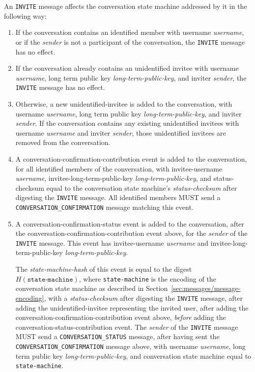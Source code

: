 \documentclass{article}
\def\npmessage#1{\texttt{#1}}
\def\field#1{\textit{#1}}
\def\smfield#1{\textsl{#1}}
\def\type#1{\textsf{#1}}
\begin{document}
An \npmessage{INVITE} message affects the conversation state machine addressed by it in the following way:
\begin{enumerate}
\item If the conversation contains an identified member with username \field{username}, or if the \field{sender} is not a participant of the conversation, the \npmessage{INVITE} message has no effect.
\item If the conversation already contains an unidentified invitee with username \field{username}, long term public key \field{long-term-public-key}, and inviter \field{sender}, the \npmessage{INVITE} message has no effect.
\item Otherwise, a new \type{unidentified-invitee} is added to the conversation, with username \field{username}, long term public key \field{long-term-public-key}, and inviter \field{sender}. If the conversation contains any existing unidentified invitees with username \field{username} and inviter \field{sender}, those unidentified invitees are removed from the conversation.
\item A \type{conversation-confirmation-contribution} event is added to the conversation, for all identified members of the conversation, with invitee-username \field{username}, invitee-long-term-public-key \field{long-term-public-key}, and status-checksum equal to the conversation state machine's \smfield{status-checksum} after digesting the \npmessage{INVITE} message. All identified members MUST send a \npmessage{CONVERSATION\_CONFIRMATION} message matching this event.
\item A \type{conversation-confirmation-status} event is added to the conversation, after the \type{conversation-confirmation-contribution} event above, for the \field{sender} of the \npmessage{INVITE} message. This event has invitee-username \field{username} and invitee-long-term-public-key \field{long-term-public-key}.

The \smfield{state-machine-hash} of this event is equal to the digest $H(\texttt{state-machine})$, where \texttt{state-machine} is the encoding of the conversation state machine as described in Section~\ref{sec:messages/message-encoding}, with a \smfield{status-checksum} after digesting the \npmessage{INVITE} message, after adding the \type{unidentified-invitee} representing the invited user, after adding the \type{conversation-confirmation-contribution} event above, \emph{before} adding the \type{conversation-status-contribution} event.
The \field{sender} of the \npmessage{INVITE} message MUST send a \npmessage{CONVERSATION\_STATUS} message, after having sent the \npmessage{CONVERSATION\_CONFIRMATION} message above, with username \field{username}, long term public key \field{long-term-public-key}, and conversation state machine equal to \texttt{state-machine}.
\label{item:messages/invite/conversation-status-event}
\end{enumerate}
\end{document}
